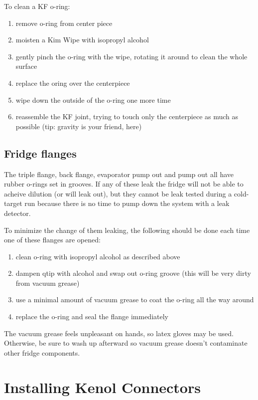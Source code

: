 To clean a KF o-ring:
\begin{enumerate}
 \item remove o-ring from center piece
 \item moisten a Kim Wipe with isopropyl alcohol
 \item gently pinch the o-ring with the wipe, rotating it around to clean the whole surface
 \item replace the oring over the centerpiece
 \item wipe down the outside of the o-ring one more time
 \item reassemble the KF joint, trying to touch only the centerpiece as much as possible (tip: gravity is your friend, here)
\end{enumerate}


\subsection{Fridge flanges}
The triple flange, \het{} back flange, evaporator pump out and \het{} pump out all have rubber o-rings set in grooves.  If any of these leak the fridge will not be able to acheive dilution (or \het{} will leak out), but they cannot be leak tested during a cold-target run because there is no time to pump down the system with a leak detector.

To minimize the change of them leaking, the following should be done each time one of these flanges are opened:

\begin{enumerate}
 \item clean o-ring with isopropyl alcohol as described above
 \item dampen qtip with alcohol and swap out o-ring groove (this will be very dirty from vacuum grease)
 \item use a minimal amount of vacuum grease to coat the o-ring all the way around
 \item replace the o-ring and seal the flange immediately
\end{enumerate}

The vacuum grease feels unpleasant on hands, so latex gloves may be used.  Otherwise, be sure to wash up afterward so vacuum grease doesn't contaminate other fridge components.

\section{Installing Kenol Connectors}

